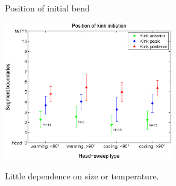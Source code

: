 \documentclass{beamer}%
\newcommand{\Hs}{Head-sweep}
\begin{document}
%
%
%
%

\begin{frame}{Position of initial bend}
%
 \begin{center}
   \includegraphics[height=6cm]{Figs/KinkStart.eps}
 \end{center}

 Little dependence on size or temperature.
%
\end{frame}

\end{document}
